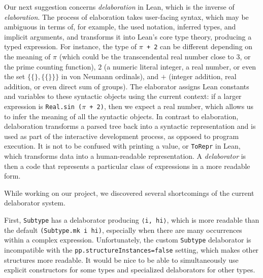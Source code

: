 Our next suggestion concerns \emph{delaboration} in Lean, which is the inverse of \emph{elaboration}. The process of elaboration takes user-facing syntax, which may be ambiguous in terms of, for example, the used notation, inferred types, and implicit arguments, and transforms it into Lean's core type theory, producing a typed expression. For instance, the type of \texttt{$\pi$ + 2} can be different depending on the meaning of $\pi$ (which could be the transcendental real number close to 3, or the prime counting function), $2$ (a numeric literal integer, a real number, or even the set $\{\{\},\{\{\}\}\}$ in von Neumann ordinals), and $+$ (integer addition, real addition, or even direct sum of groups). The elaborator assigns Lean constants and variables to these syntactic objects using the current context: if a larger expression is \texttt{Real.sin ($\pi$ + 2)}, then we expect a real number, which allows us to infer the meaning of all the syntactic objects. In contrast to elaboration, delaboration transforms a parsed tree back into a syntactic representation and is used as part of the interactive development process, as opposed to program execution. It is not to be confused with printing a value, or \texttt{ToRepr} in Lean, which transforms data into a human-readable representation. A \hbox{\emph{delaborator}} is then a code that represents a particular class of expressions in a more readable form. %

While working on our project, we %
discovered several shortcomings of the current delaborator system.

First, \texttt{Subtype} has a delaborator producing \texttt{⟨i, hi⟩}, which is more readable than the default \texttt{(Subtype.mk i hi)}, especially when there are many occurrences within a complex expression. Unfortunately, the custom \texttt{Subtype} delaborator is incompatible with the \texttt{pp.structureInstances=false} setting, which makes other structures more readable. It would be nice to be able to simultaneously use explicit constructors for some types and specialized delaborators for other types.

